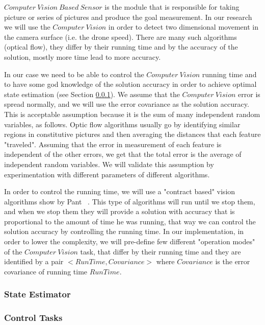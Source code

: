 \documentclass[11pt]{article}
\begin{document}
$Computer~Vision~Based~Sensor$ is the module that is responsible for taking picture or series of pictures and produce the goal measurement.
In our research we will use the $Computer~Vision$ in order to detect two dimensional movement in the camera surface (i.e. the drone speed).
There are many such algorithms (optical flow), they differ by their running time and by the accuracy of the solution, mostly more time lead to more accuracy.

In our case we need to be able to control the $Computer~Vision$ running time and to have some god knowledge of the solution accuracy in order to achieve optimal state estimation (see Section \ref{sec:estimator}).
We assume that the $Computer~Vision$ error is spread normally, and we will use the error covariance as the solution accuracy. 
This is acceptable assumption because it is the sum of many independent random variables, as follows. Optic flow algorithms usually go by identifying similar regions in constitutive pictures and then averaging the distances that each feature "traveled". Assuming that the error in measurement of each feature is independent of the other errors, we get that the total error is the average of independent random variables. We will validate this assumption by experimentation with different parameters of different algorithms.

In order to control the running time, we will use a "contract based" vision algorithms show by Pant ~\cite{UPenn-Pant}.
This type of algorithms will run until we stop them, and when we stop them they will provide a solution with accuracy that is proportional to the amount of time he was running, that way we can control the solution accuracy by controlling the running time.
In our implementation, in order to lower the complexity, we will pre-define few different "operation modes" of the $Computer~Vision$ task, that differ by their running time and they are identified by a pair $<RunTime, Covariance>$ where $Covariance$ is the error covariance of running time $RunTime$.

\subsubsection{State Estimator}
\label{sec:estimator}

\subsubsection{Control Tasks}
\end{document}
